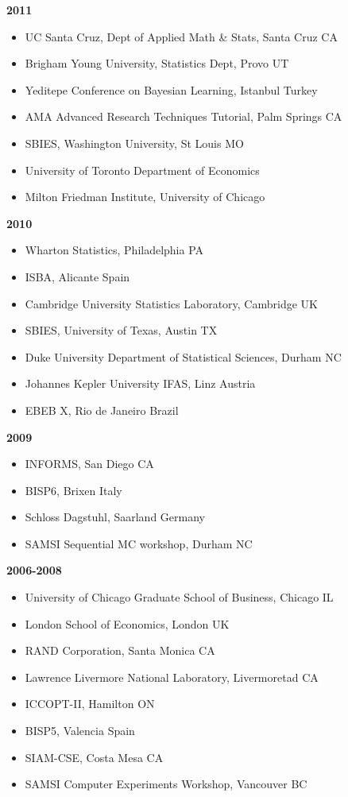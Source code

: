 \documentclass[margin,line]{res}
\begin{document}
\begin{resume}
{\bf 2011}
\begin{itemize}
\item UC Santa Cruz, Dept of Applied Math \& Stats, Santa Cruz CA
\item Brigham Young University, Statistics Dept, Provo UT
\item Yeditepe Conference on Bayesian Learning, Istanbul Turkey
\item AMA Advanced Research Techniques Tutorial,  Palm Springs CA
\item SBIES, Washington University, St Louis MO
\item University of Toronto Department of Economics
\item Milton Friedman Institute, University of Chicago
\end{itemize}


{\bf 2010}
\begin{itemize}
\item Wharton Statistics, Philadelphia PA
\item ISBA, Alicante Spain
\item Cambridge University Statistics Laboratory, Cambridge UK
\item SBIES, University of Texas, Austin TX
\item Duke University Department of Statistical Sciences, Durham NC
\item Johannes Kepler University IFAS, Linz Austria
\item EBEB X, Rio de Janeiro Brazil
\end{itemize}

{\bf 2009}
\begin{itemize}
\item INFORMS, San Diego CA
\item BISP6, Brixen Italy
\item Schloss Dagstuhl, Saarland Germany
\item SAMSI Sequential MC workshop, Durham NC
\end{itemize}


{\bf 2006-2008}
\begin{itemize}
\item University of Chicago Graduate School of Business, Chicago IL
\item London School of Economics, London UK
\item RAND Corporation, Santa Monica CA
\item Lawrence Livermore National Laboratory, Livermoretad CA
\item ICCOPT-II, Hamilton ON
\item BISP5, Valencia Spain
\item SIAM-CSE, Costa Mesa CA
\item SAMSI Computer Experiments Workshop, Vancouver BC
\end{itemize}




\end{resume}
\end{document}
